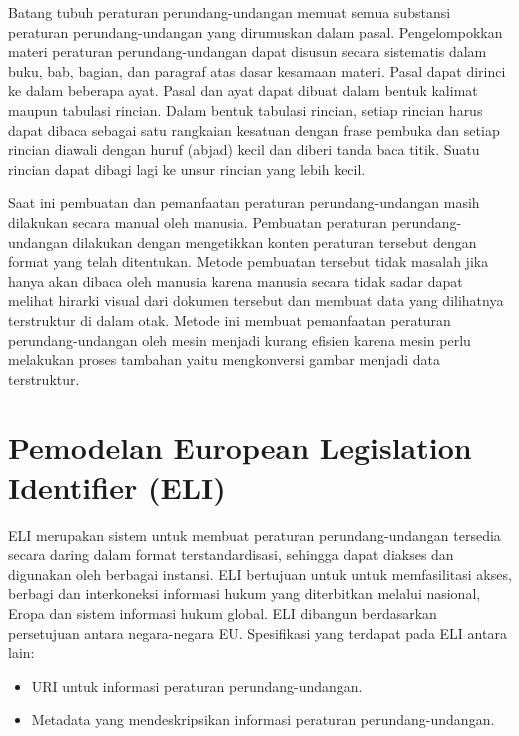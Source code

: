 Batang tubuh peraturan perundang-undangan memuat semua substansi peraturan perundang-undangan yang
dirumuskan dalam pasal. Pengelompokkan materi peraturan perundang-undangan dapat disusun secara
sistematis dalam buku, bab, bagian, dan paragraf atas dasar kesamaan materi. Pasal dapat dirinci ke
dalam beberapa ayat. Pasal dan ayat dapat dibuat dalam bentuk kalimat maupun tabulasi rincian. Dalam
bentuk tabulasi rincian, setiap rincian harus dapat dibaca sebagai satu rangkaian kesatuan dengan
frase pembuka dan setiap rincian diawali dengan huruf (abjad) kecil dan diberi tanda baca titik.
Suatu rincian dapat dibagi lagi ke unsur rincian yang lebih kecil.

Saat ini pembuatan dan pemanfaatan peraturan perundang-undangan masih dilakukan secara manual oleh
manusia. Pembuatan peraturan perundang-undangan dilakukan dengan mengetikkan konten peraturan
tersebut dengan format yang telah ditentukan. Metode pembuatan tersebut tidak masalah jika hanya
akan dibaca oleh manusia karena manusia secara tidak sadar dapat melihat hirarki visual dari dokumen
tersebut dan membuat data yang dilihatnya terstruktur di dalam otak. Metode ini membuat pemanfaatan
peraturan perundang-undangan oleh mesin menjadi kurang efisien karena mesin perlu melakukan proses
tambahan yaitu mengkonversi gambar menjadi data terstruktur.

\section{Pemodelan European Legislation Identifier
  (ELI)}\label{pemodelan-european-legislation-identifier-eli}

ELI merupakan sistem untuk membuat peraturan perundang-undangan tersedia secara daring dalam format
terstandardisasi, sehingga dapat diakses dan digunakan oleh berbagai instansi. ELI bertujuan untuk
untuk memfasilitasi akses, berbagi dan interkoneksi informasi hukum yang diterbitkan melalui
nasional, Eropa dan sistem informasi hukum global. ELI dibangun berdasarkan persetujuan antara
negara-negara EU. Spesifikasi yang terdapat pada ELI antara lain:

\begin{itemize}
  \itemsep1pt\parskip0pt
  \item
        URI untuk informasi peraturan perundang-undangan.
  \item
        Metadata yang mendeskripsikan informasi peraturan perundang-undangan.
\end{itemize}





